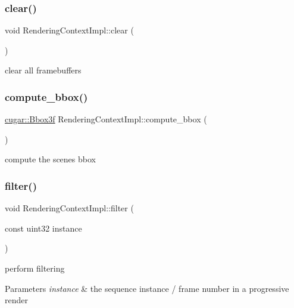 \subsubsection{\texorpdfstring{clear()}{clear()}}
{\footnotesize\ttfamily void Rendering\+Context\+Impl\+::clear (\begin{DoxyParamCaption}{ }\end{DoxyParamCaption})}

clear all framebuffers \mbox{\label{struct_rendering_context_impl_a0cca8173d0b80d0469a838a0613aa0af}} 
\subsubsection{\texorpdfstring{compute\+\_\+bbox()}{compute\_bbox()}}
{\footnotesize\ttfamily \hyperlink{structcugar_1_1_bbox}{cugar\+::\+Bbox3f} Rendering\+Context\+Impl\+::compute\+\_\+bbox (\begin{DoxyParamCaption}{ }\end{DoxyParamCaption})}

compute the scene\textquotesingle{}s bbox \mbox{\label{struct_rendering_context_impl_a8c5fa978dc9a84c80828b493f17853bf}} 
\subsubsection{\texorpdfstring{filter()}{filter()}}
{\footnotesize\ttfamily void Rendering\+Context\+Impl\+::filter (\begin{DoxyParamCaption}\item[{const uint32}]{instance }\end{DoxyParamCaption})}

perform filtering


\begin{DoxyParams}{Parameters}
{\em instance} & the sequence instance / frame number in a progressive render \\
\hline
\end{DoxyParams}
\mbox{\label{struct_rendering_context_impl_abef1aefa9f7fa7773c747652572436b7}} 
